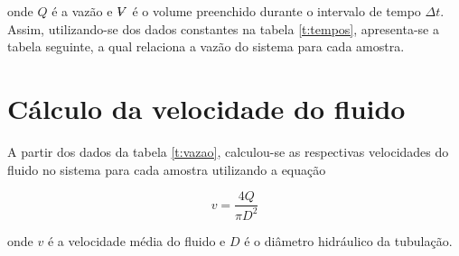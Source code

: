 onde $Q$ é a vazão e $\Vol$ é o volume preenchido durante o intervalo de tempo
$\Delta t$. Assim, utilizando-se dos dados constantes na tabela \ref{t:tempos},
apresenta-se a tabela seguinte, a qual relaciona a vazão do sistema para cada
amostra.

\begin{table}[H]
\centering
\caption{Vazão amostral por ângulo de abertura.}
\label{t:vazao}
\end{table}

\section{Cálculo da velocidade do fluido}
\label{sec:VelFluido}

A partir dos dados da tabela \ref{t:vazao}, calculou-se as respectivas
velocidades do fluido no sistema para cada amostra utilizando a equação

\begin{equation}
  v = \frac{4 Q}{\pi D^2}
\end{equation}

onde $v$ é a velocidade média do fluido e $D$ é o diâmetro hidráulico da
tubulação.

